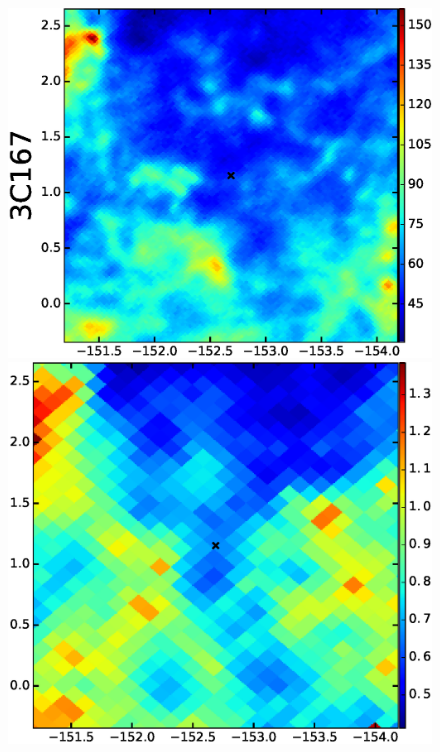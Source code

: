 \documentclass[preprint]{emulateapj}
\begin{document}
\begin{figure}[h!]
\includegraphics[scale=0.23]{fig/src_eg_apd0_r2c0.eps}
\includegraphics[scale=0.21]{fig/src_eg_apd0_r2c1.eps}

\end{figure}
\end{document}
